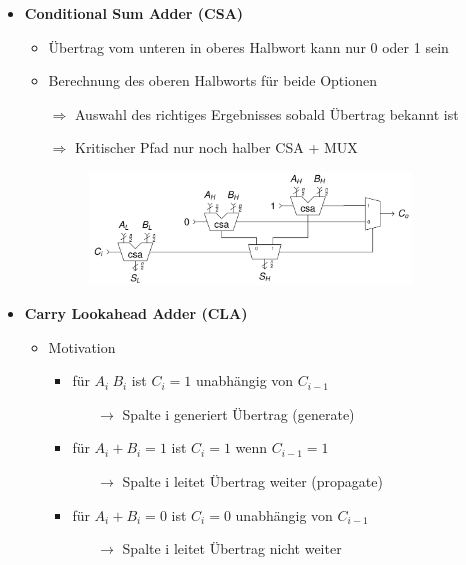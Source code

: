 \documentclass[11pt,a4paper]{article}
\begin{document}
\begin{itemize}
\item \textbf{Conditional Sum Adder (CSA)}
	\begin{itemize}
	\item Übertrag vom unteren in oberes Halbwort kann nur 0 oder 1 sein
	\item Berechnung des oberen Halbworts für beide Optionen
	\item[$\Rightarrow$] Auswahl des richtiges Ergebnisses sobald Übertrag bekannt ist
	\item[$\Rightarrow$] Kritischer Pfad nur noch halber CSA + MUX
	\item[]
			\begin{figure}[H]
				\begin{center}
				\includegraphics[height=3cm]{csa1}
				\end{center}
			\end{figure}
	\end{itemize}

\item \textbf{Carry Lookahead Adder (CLA)}
	\begin{itemize}
	\item Motivation	
		\begin{itemize}
		\item für $A_i~B_i$ ist $C_i = 1$ unabhängig von $C_{i-1}$
			\begin{itemize}
			\item[$\rightarrow$] Spalte i generiert Übertrag (generate)
			\end{itemize}
		\item für $A_i+B_i = 1$ ist $C_i = 1$ wenn $C_{i-1} = 1$
			\begin{itemize}
			\item[$\rightarrow$] Spalte  i leitet Übertrag weiter (propagate)
			\end{itemize}
		\item für $A_i + B_i = 0$ ist $C_i = 0$ unabhängig von $C_{i-1}$
			\begin{itemize}
			\item[$\rightarrow$] Spalte i leitet Übertrag nicht weiter
			\end{itemize}
		\end{itemize}
		

\end{itemize}
\end{itemize}
\end{document}
